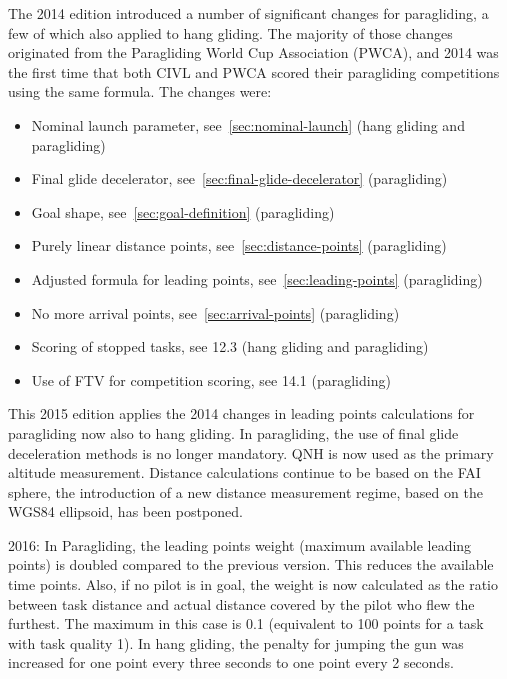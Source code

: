 \documentclass{article}
\begin{document}
The 2014 edition introduced a number of significant changes for paragliding,
a few of which also applied to hang gliding. The majority of those changes
originated from the Paragliding World Cup Association (PWCA), and 2014 was the
first time that both CIVL and PWCA scored their paragliding competitions using
the same formula. The changes were:
\begin{itemize}
    \item
        Nominal launch parameter, see~\ref{sec:nominal-launch} (hang gliding
        and paragliding)
    \item
        Final glide decelerator, see~\ref{sec:final-glide-decelerator}
        (paragliding)
    \item
        Goal shape, see~\ref{sec:goal-definition} (paragliding)
    \item
        Purely linear distance points, see~\ref{sec:distance-points}
        (paragliding)
    \item
        Adjusted formula for leading points, see~\ref{sec:leading-points}
        (paragliding)
    \item
        No more arrival points, see~\ref{sec:arrival-points} (paragliding)
    \item
        Scoring of stopped tasks, see 12.3 (hang gliding and paragliding)
    \item
        Use of FTV for competition scoring, see 14.1 (paragliding)
\end{itemize}
This 2015 edition applies the 2014 changes in leading points calculations for
paragliding now also to hang gliding. In paragliding, the use of final glide
deceleration methods is no longer mandatory. QNH is now used as the primary
altitude measurement. Distance calculations continue to be based on the FAI
sphere, the introduction of a new distance measurement regime, based on the
WGS84 ellipsoid, has been postponed.

2016: In Paragliding, the leading points weight (maximum available leading
points) is doubled compared to the previous version. This reduces the available
time points. Also, if no pilot is in goal, the weight is now calculated as the
ratio between task distance and actual distance covered by the pilot who flew
the furthest. The maximum in this case is 0.1 (equivalent to 100 points for
a task with task quality 1). In hang gliding, the penalty for jumping the gun
was increased for one point every three seconds to one point every 2 seconds.
\end{document}
